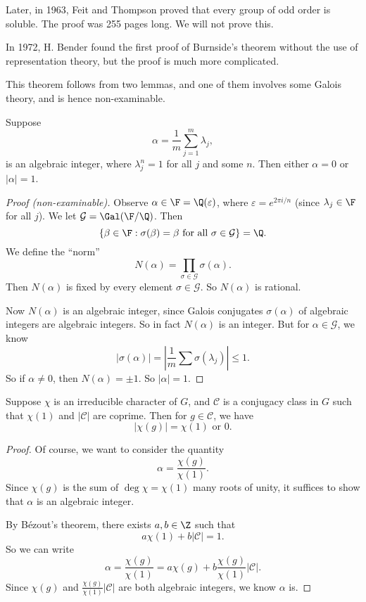 \documentclass[a4paper]{article}
\begin{document}
Later, in 1963, Feit and Thompson proved that every group of odd order is soluble. The proof was 255 pages long. We will not prove this.

In 1972, H. Bender found the first proof of Burnside's theorem without the use of representation theory, but the proof is much more complicated.

This theorem follows from two lemmas, and one of them involves some Galois theory, and is hence non-examinable.
\begin{lemma}
  Suppose
  \[
    \alpha = \frac{1}{m} \sum_{j = 1}^m \lambda_j,
  \]
  is an algebraic integer, where $\lambda_j^n = 1$ for all $j$ and some $n$. Then either $\alpha = 0$ or $|\alpha| = 1$.
\end{lemma}

\begin{proof}[Proof (non-examinable)]
  Observe $\alpha \in \F = \Q(\varepsilon)$, where $\varepsilon = e^{2\pi i/n}$ (since $\lambda_j \in \F$ for all $j$). We let $\mathcal{G} = \Gal(\F/\Q)$. Then
  \[
    \{\beta \in \F: \sigma(\beta) = \beta \text{ for all }\sigma \in \mathcal{G}\} = \Q.
  \]
  We define the ``norm''
  \[
    N(\alpha) = \prod_{\sigma \in \mathcal{G}} \sigma(\alpha).
  \]
  Then $N(\alpha)$ is fixed by every element $\sigma \in \mathcal{G}$. So $N(\alpha)$ is rational.

  Now $N(\alpha)$ is an algebraic integer, since Galois conjugates $\sigma(\alpha)$ of algebraic integers are algebraic integers. So in fact $N(\alpha)$ is an integer. But for $\alpha \in \mathcal{G}$, we know
  \[
    |\sigma(\alpha)| = \left|\frac{1}{m} \sum \sigma(\lambda_j)\right| \leq 1.
  \]
  So if $\alpha \not= 0$, then $N(\alpha) = \pm 1$. So $|\alpha| = 1$.
\end{proof}

\begin{lemma}
  Suppose $\chi$ is an irreducible character of $G$, and $\mathcal{C}$ is a conjugacy class in $G$ such that $\chi(1)$ and $|\mathcal{C}|$ are coprime. Then for $g \in \mathcal{C}$, we have
  \[
    |\chi(g)| = \chi(1) \text{ or }0.
  \]
\end{lemma}

\begin{proof}
  Of course, we want to consider the quantity
  \[
    \alpha = \frac{\chi(g)}{\chi(1)}.
  \]
  Since $\chi(g)$ is the sum of $\deg \chi = \chi(1)$ many roots of unity, it suffices to show that $\alpha$ is an algebraic integer.

  By B\'ezout's theorem, there exists $a, b \in \Z$ such that
  \[
    a \chi(1) + b |\mathcal{C}| = 1.
  \]
  So we can write
  \[
    \alpha = \frac{\chi(g)}{\chi(1)} = a\chi(g) + b\frac{\chi(g)}{\chi(1)} |\mathcal{C}|.
  \]
  Since $\chi(g)$ and $\frac{\chi(g)}{\chi(1)} |\mathcal{C}|$ are both algebraic integers, we know $\alpha$ is.
\end{proof}
\end{document}
